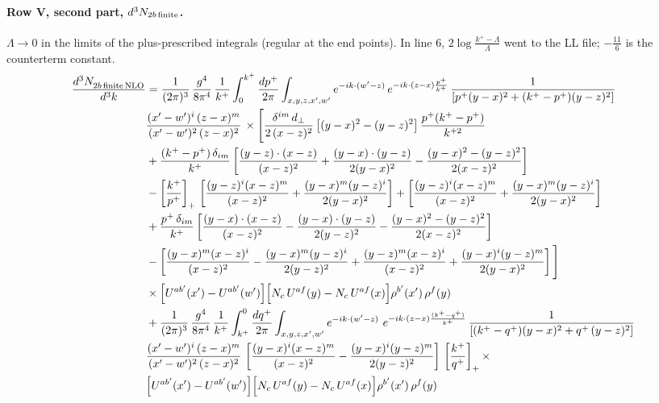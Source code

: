 \documentclass[10pt]{article}
\numberwithin{equation}{section}
\begin{document}
\paragraph{Row V, second part, $d^3N_{2b\,\rm finite}$.}
$\Lambda\to0$ in the limits of the plus-prescribed integrals (regular at the end points). In line 6, $2\log\frac{k^+-\Lambda}{\Lambda}$ went to the LL file; $-\frac{11}{6}$ is the counterterm constant.
\begin{align}
    \frac{d^{3}N_{2b\,\rm finite\, NLO}^{\rm}}{d^{3}k} & =  \frac{1}{(2\pi)^{3}}\,\frac{g^{4}}{8\pi^{4}}\,\frac{1}{k^{+}}\int_{0}^{k^{+}}\frac{dp^{+}}{2\pi}\int_{x,y,z,x',w'}e^{-ik\cdot(w'-z)}\,e^{-ik\cdot(z-x)\frac{p^{+}}{k^{+}}}\,\frac{1}{\left[p^{+}(y-x)^{2}+(k^{+}-p^{+})(y-z)^{2}\right]}\notag \\ & \frac{(x'-w')^{i}\,(z-x)^{m}}{(x'-w')^{2}\,(z-x)^{2}}\,\times\Bigg[\frac{\delta^{im}\,d_{\perp}}{2\,(x-z)^{2}}\left[(y-x)^{2}-(y-z)^{2}\right]\frac{p^{+}(k^{+}-p^{+})}{k^{+2}}
\notag \\ & +\frac{(k^{+}-p^{+})\,\delta_{im}}{k^{+}}\left[\frac{(y-z)\cdot(x-z)}{(x-z)^{2}}+\frac{(y-x)\cdot(y-z)}{2(y-x)^{2}}-\frac{(y-x)^{2}-(y-z)^{2}}{2(x-z)^{2}}\right]\notag\\
&-\left[\frac{k^{+}}{p^{+}}\right]_{+}\,\left[\frac{(y-z)^{i}(x-z)^{m}}{(x-z)^{2}}+\frac{(y-x)^{m}(y-z)^{i}}{2(y-x)^{2}}\right]+\left[\frac{(y-z)^{i}(x-z)^{m}}{(x-z)^{2}}+\frac{(y-x)^{m}(y-z)^{i}}{2(y-x)^{2}}\right]\notag\\
&+\frac{p^{+}\,\delta_{im}}{k^{+}}\left[\frac{(y-x)\cdot(x-z)}{(x-z)^{2}}-\frac{(y-x)\cdot(y-z)}{2(y-z)^{2}}-\frac{(y-x)^{2}-(y-z)^{2}}{2(x-z)^{2}}\right]\notag\\
&-\left[\frac{(y-x)^{m}(x-z)^{i}}{(x-z)^{2}}-\frac{(y-x)^{m}(y-z)^{i}}{2(y-z)^{2}}+\frac{(y-z)^{m}(x-z)^{i}}{(x-z)^{2}}+\frac{(y-x)^{i}(y-z)^{m}}{2(y-x)^{2}}\right]\Bigg]\notag\\
&\times\Big[U^{ab'}(x')-U^{ab'}(w')\Big]\Big[N_{c}\,U^{af}(y)-N_{c}\,U^{af}(x)\Big]\rho^{b'}(x')\,\rho^{f}(y) \notag \\
& + \frac{1}{(2\pi)^{3}}\,\frac{g^{4}}{8\pi^{4}}\,\frac{1}{k^{+}}\int_{k^{+}}^{0}\frac{dq^{+}}{2\pi}\int_{x,y,z,x',w'}e^{-ik\cdot(w'-z)}\ e^{-ik\cdot(z-x)\frac{(k^{+}-q^{+})}{k^{+}}}\,\frac{1}{\left[(k^{+}-q^{+})(y-x)^{2}+q^{+}\,(y-z)^{2}\right]}\notag \\ & \frac{(x'-w')^{i}\,(z-x)^{m}}{(x'-w')^{2}\,(z-x)^{2}}\,\left[\frac{(y-x)^{i}(x-z)^{m}}{(x-z)^{2}}-\frac{(y-x)^{i}(y-z)^{m}}{2(y-z)^{2}}\right]\,\left[\frac{k^{+}}{q^{+}}\right]_{+}\times\notag \\ & \Big[U^{ab'}(x')-U^{ab'}(w')\Big]\Big[N_{c}\,U^{af}(y)-N_{c}\,U^{af}(x)\Big]\rho^{b'}(x')\,\rho^{f}(y) \notag \\

\end{align}
\end{document}
